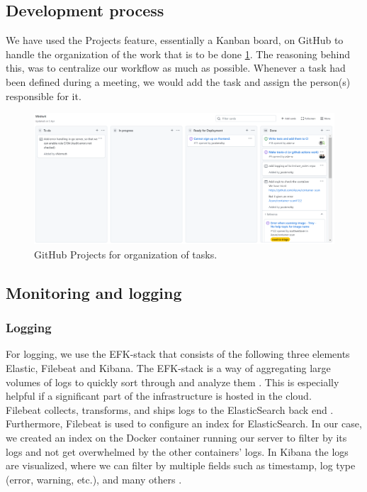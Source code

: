 \documentclass{article}
\begin{document}
\subsection{Development process}

\noindent We have used the Projects feature, essentially a Kanban board, on GitHub to handle the organization of the work that is to be done \ref{fig:githubprojects}. The reasoning behind this, was to centralize our workflow as much as possible. Whenever a task had been defined during a meeting, we would add the task and assign the person(s) responsible for it.
\begin{figure}[H]
   \centering
   \includegraphics[width=\textwidth]{GitHubProjects.png}
   \caption{GitHub Projects for organization of tasks.}
   \label{fig:githubprojects}
\end{figure}

\subsection{Monitoring and logging}

\subsubsection{Logging}
For logging, we use the EFK-stack that consists of the following three elements Elastic, Filebeat and Kibana. The EFK-stack is a way of aggregating large volumes of logs to quickly sort through and analyze them \cite{elk-stack}. This is especially helpful if a significant part of the infrastructure is hosted in the cloud.
\\
Filebeat collects, transforms, and ships logs to the ElasticSearch back end \cite{filebeat}. Furthermore, Filebeat is used to configure an index for ElasticSearch. In our case, we created an index on the Docker container running our server to filter by its logs and not get overwhelmed by the other containers' logs. In Kibana the logs are visualized, where we can filter by multiple fields such as timestamp, log type (error, warning, etc.), and many others \cite{kibana}.
\end{document}
